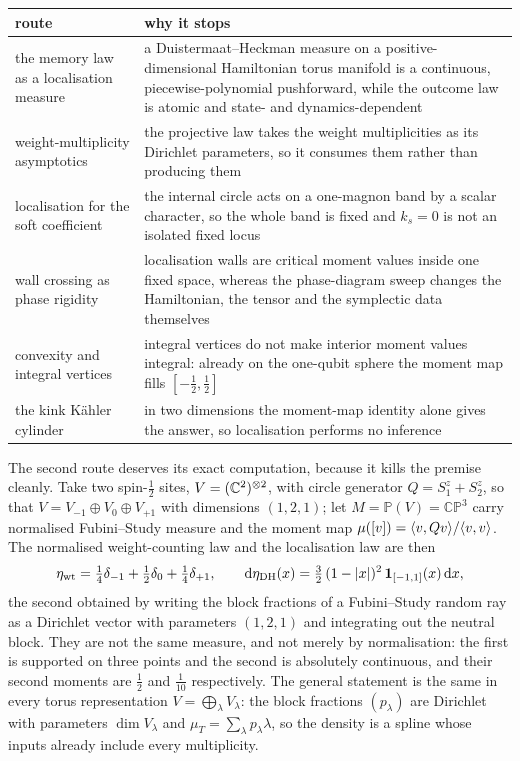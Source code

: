 \begin{center}
\begin{tabular}{@{}p{}p{}@{}}
\toprule
route & why it stops \\
\midrule
the memory law as a localisation measure &
a Duistermaat--Heckman measure on a positive-dimensional Hamiltonian torus
manifold is a continuous, piecewise-polynomial pushforward, while the outcome
law is atomic and state- and dynamics-dependent \\[2pt]
weight-multiplicity asymptotics &
the projective law takes the weight multiplicities as its Dirichlet
parameters, so it consumes them rather than producing them \\[2pt]
localisation for the soft coefficient &
the internal circle acts on a one-magnon band by a scalar character, so the
whole band is fixed and $k_s = 0$ is not an isolated fixed locus \\[2pt]
wall crossing as phase rigidity &
localisation walls are critical moment values inside one fixed space, whereas
the phase-diagram sweep changes the Hamiltonian, the tensor and the symplectic
data themselves \\[2pt]
convexity and integral vertices &
integral vertices do not make interior moment values integral: already on the
one-qubit sphere the moment map fills $[-\tfrac12,\tfrac12]$ \\[2pt]
the kink K\"ahler cylinder &
in two dimensions the moment-map identity alone gives the answer, so
localisation performs no inference \\
\bottomrule
\end{tabular}
\end{center}

The second route deserves its exact computation, because it kills the premise
cleanly. Take two spin-$\tfrac12$ sites, $V = (\mathbb{C}^2)^{\otimes 2}$, with circle
generator $Q = S^z_1 + S^z_2$, so that $V = V_{-1} \oplus V_0 \oplus V_{+1}$
with dimensions $(1,2,1)$; let $M = \mathbb{P}(V) = \mathbb{CP}^3$ carry
normalised Fubini--Study measure and the moment map
$\mu([v]) = \langle v,Qv\rangle/\langle v,v\rangle$. The normalised weight-counting law and
the localisation law are then
\begin{equation}
  \eta_{\mathrm{wt}}
  = \tfrac14\delta_{-1} + \tfrac12\delta_{0} + \tfrac14\delta_{+1},
  \qquad
  \mathrm{d}\eta_{\mathrm{DH}}(x)
  = \tfrac32\,(1-\lvert x\rvert)^2\,\mathbf{1}_{[-1,1]}(x)\,\mathrm{d}x ,
  \label{eq:dh-cp3}
\end{equation}
the second obtained by writing the block fractions of a Fubini--Study random
ray as a Dirichlet vector with parameters $(1,2,1)$ and integrating out the
neutral block. They are not the same measure, and not merely by normalisation:
the first is supported on three points and the second is absolutely
continuous, and their second moments are $\tfrac12$ and $\tfrac{1}{10}$
respectively. The general statement is the same in every torus
representation $V = \bigoplus_\lambda V_\lambda$: the block fractions
$(p_\lambda)$ are Dirichlet with parameters $\dim V_\lambda$ and
$\mu_T = \sum_\lambda p_\lambda \lambda$, so the density is a spline whose
inputs already include every multiplicity.


